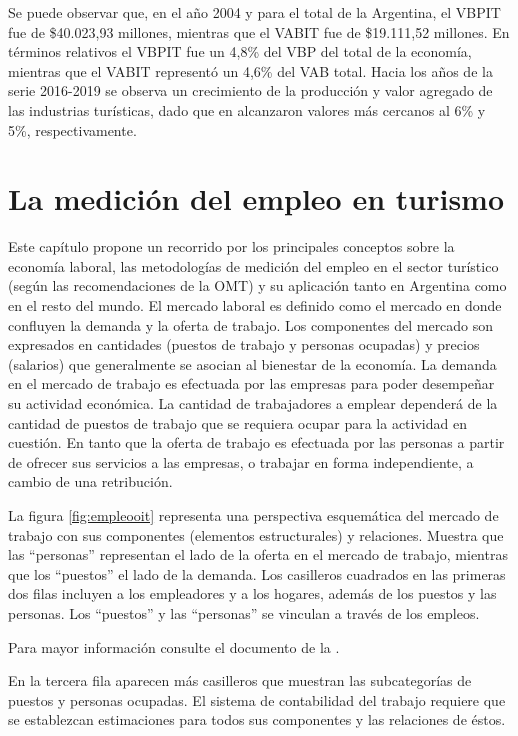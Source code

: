 \documentclass[
  openany]{book}
\begin{document}
Se puede observar que, en el año 2004 y para el total de la Argentina, el VBPIT fue de \$40.023,93 millones, mientras que el VABIT fue de \$19.111,52 millones. En términos relativos el VBPIT fue un 4,8\% del VBP del total de la economía, mientras que el VABIT representó un 4,6\% del VAB total. Hacia los años de la serie 2016-2019 se observa un crecimiento de la producción y valor agregado de las industrias turísticas, dado que en alcanzaron valores más cercanos al 6\% y 5\%, respectivamente.

\hypertarget{medicion-empleo}{%
\chapter{\texorpdfstring{\textbf{La medición del empleo en turismo}}{La medición del empleo en turismo}}\label{medicion-empleo}}

Este capítulo propone un recorrido por los principales conceptos sobre la economía laboral, las metodologías de medición del empleo en el sector turístico (según las recomendaciones de la OMT) y su aplicación tanto en Argentina como en el resto del mundo.
El mercado laboral es definido como el mercado en donde confluyen la demanda y la oferta de trabajo. Los componentes del mercado son expresados en cantidades (puestos de trabajo y personas ocupadas) y precios (salarios) que generalmente se asocian al bienestar de la economía.
La demanda en el mercado de trabajo es efectuada por las empresas para poder desempeñar su actividad económica. La cantidad de trabajadores a emplear dependerá de la cantidad de puestos de trabajo que se requiera ocupar para la actividad en cuestión.
En tanto que la oferta de trabajo es efectuada por las personas a partir de ofrecer sus servicios a las empresas, o trabajar en forma independiente, a cambio de una retribución.

La figura \ref{fig:empleooit} representa una perspectiva esquemática del mercado de trabajo con sus componentes (elementos estructurales) y relaciones. Muestra que las ``personas'' representan el lado de la oferta en el mercado de trabajo, mientras que los ``puestos'' el lado de la demanda. Los casilleros cuadrados en las primeras dos filas incluyen a los empleadores y a los hogares, además de los puestos y las personas. Los ``puestos'' y las ``personas'' se vinculan a través de los empleos.

Para mayor información consulte el documento de la \citet{oit2014}.

En la tercera fila aparecen más casilleros que muestran las subcategorías de puestos y personas ocupadas. El sistema de contabilidad del trabajo requiere que se establezcan estimaciones para todos sus componentes y las relaciones de éstos.
\end{document}
